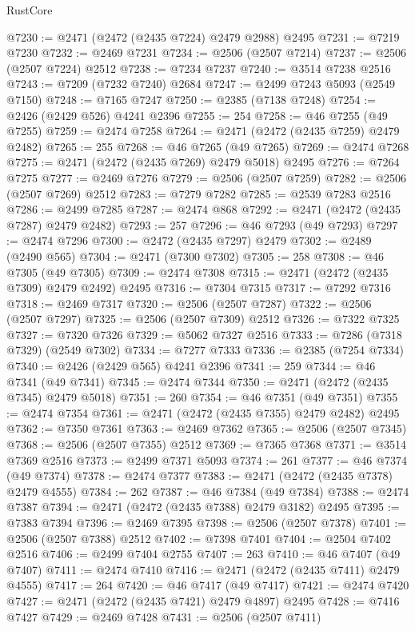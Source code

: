\begin{lexlean}{RustCore}
\begin{coremodule}
@7230 := @2471 (@2472 (@2435 @7224) @2479 @2988) @2495
@7231 := @7219 @7230
@7232 := @2469 @7231
@7234 := @2506 (@2507 @7214)
@7237 := @2506 (@2507 @7224) @2512
@7238 := @7234 @7237
@7240 := @3514 @7238 @2516
@7243 := @7209 (@7232 @7240) @2684
@7247 := @2499 @7243 @5093 (@2549 @7150)
@7248 := @7165 @7247
@7250 := @2385 (@7138 @7248)
@7254 := @2426 (@2429 @526) @4241 @2396
@7255 := 254
@7258 := @46 @7255 (@49 @7255)
@7259 := @2474 @7258
@7264 := @2471 (@2472 (@2435 @7259) @2479 @2482)
@7265 := 255
@7268 := @46 @7265 (@49 @7265)
@7269 := @2474 @7268
@7275 := @2471 (@2472 (@2435 @7269) @2479 @5018) @2495
@7276 := @7264 @7275
@7277 := @2469 @7276
@7279 := @2506 (@2507 @7259)
@7282 := @2506 (@2507 @7269) @2512
@7283 := @7279 @7282
@7285 := @2539 @7283 @2516
@7286 := @2499 @7285
@7287 := @2474 @868
@7292 := @2471 (@2472 (@2435 @7287) @2479 @2482)
@7293 := 257
@7296 := @46 @7293 (@49 @7293)
@7297 := @2474 @7296
@7300 := @2472 (@2435 @7297) @2479
@7302 := @2489 (@2490 @565)
@7304 := @2471 (@7300 @7302)
@7305 := 258
@7308 := @46 @7305 (@49 @7305)
@7309 := @2474 @7308
@7315 := @2471 (@2472 (@2435 @7309) @2479 @2492) @2495
@7316 := @7304 @7315
@7317 := @7292 @7316
@7318 := @2469 @7317
@7320 := @2506 (@2507 @7287)
@7322 := @2506 (@2507 @7297)
@7325 := @2506 (@2507 @7309) @2512
@7326 := @7322 @7325
@7327 := @7320 @7326
@7329 := @5062 @7327 @2516
@7333 := @7286 (@7318 @7329) (@2549 @7302)
@7334 := @7277 @7333
@7336 := @2385 (@7254 @7334)
@7340 := @2426 (@2429 @565) @4241 @2396
@7341 := 259
@7344 := @46 @7341 (@49 @7341)
@7345 := @2474 @7344
@7350 := @2471 (@2472 (@2435 @7345) @2479 @5018)
@7351 := 260
@7354 := @46 @7351 (@49 @7351)
@7355 := @2474 @7354
@7361 := @2471 (@2472 (@2435 @7355) @2479 @2482) @2495
@7362 := @7350 @7361
@7363 := @2469 @7362
@7365 := @2506 (@2507 @7345)
@7368 := @2506 (@2507 @7355) @2512
@7369 := @7365 @7368
@7371 := @3514 @7369 @2516
@7373 := @2499 @7371 @5093
@7374 := 261
@7377 := @46 @7374 (@49 @7374)
@7378 := @2474 @7377
@7383 := @2471 (@2472 (@2435 @7378) @2479 @4555)
@7384 := 262
@7387 := @46 @7384 (@49 @7384)
@7388 := @2474 @7387
@7394 := @2471 (@2472 (@2435 @7388) @2479 @3182) @2495
@7395 := @7383 @7394
@7396 := @2469 @7395
@7398 := @2506 (@2507 @7378)
@7401 := @2506 (@2507 @7388) @2512
@7402 := @7398 @7401
@7404 := @2504 @7402 @2516
@7406 := @2499 @7404 @2755
@7407 := 263
@7410 := @46 @7407 (@49 @7407)
@7411 := @2474 @7410
@7416 := @2471 (@2472 (@2435 @7411) @2479 @4555)
@7417 := 264
@7420 := @46 @7417 (@49 @7417)
@7421 := @2474 @7420
@7427 := @2471 (@2472 (@2435 @7421) @2479 @4897) @2495
@7428 := @7416 @7427
@7429 := @2469 @7428
@7431 := @2506 (@2507 @7411)

\end{coremodule}
\end{lexlean}
